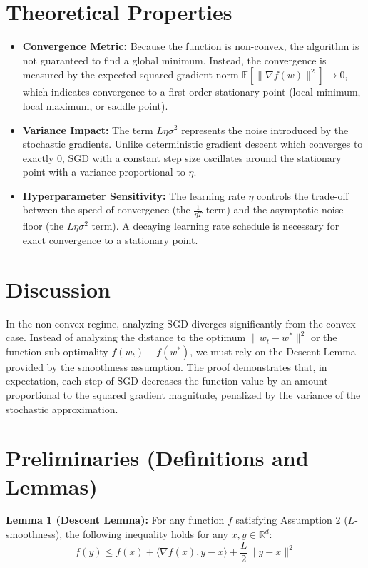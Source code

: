 \documentclass[11pt]{article}
\begin{document}
\section*{Theoretical Properties}
\begin{itemize}
    \item \textbf{Convergence Metric:} Because the function is non-convex, the algorithm is not guaranteed to find a global minimum. Instead, the convergence is measured by the expected squared gradient norm $\mathbb{E}[\|\nabla f(w)\|^2] \rightarrow 0$, which indicates convergence to a first-order stationary point (local minimum, local maximum, or saddle point).
    \item \textbf{Variance Impact:} The term $L\eta\sigma^2$ represents the noise introduced by the stochastic gradients. Unlike deterministic gradient descent which converges to exactly $0$, SGD with a constant step size oscillates around the stationary point with a variance proportional to $\eta$.
    \item \textbf{Hyperparameter Sensitivity:} The learning rate $\eta$ controls the trade-off between the speed of convergence (the $\frac{1}{\eta T}$ term) and the asymptotic noise floor (the $L\eta\sigma^2$ term). A decaying learning rate schedule is necessary for exact convergence to a stationary point.
\end{itemize}

\section*{Discussion}
In the non-convex regime, analyzing SGD diverges significantly from the convex case. Instead of analyzing the distance to the optimum $\|w_t - w^*\|^2$ or the function sub-optimality $f(w_t) - f(w^*)$, we must rely on the Descent Lemma provided by the smoothness assumption. The proof demonstrates that, in expectation, each step of SGD decreases the function value by an amount proportional to the squared gradient magnitude, penalized by the variance of the stochastic approximation.

\section*{Preliminaries (Definitions and Lemmas)}
\textbf{Lemma 1 (Descent Lemma):} For any function $f$ satisfying Assumption 2 ($L$-smoothness), the following inequality holds for any $x, y \in \mathbb{R}^d$:
$$f(y) \leq f(x) + \langle \nabla f(x), y - x \rangle + \frac{L}{2}\|y - x\|^2$$
\end{document}
